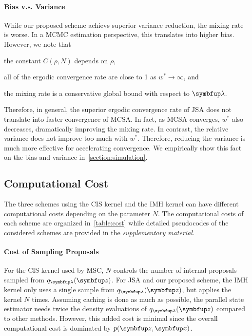 

\paragraph{Bias v.s. Variance}
While our proposed scheme achievs superior variance reduction, the mixing rate is worse.
In a MCMC estimation perspective, this translates into higher bias.
However, we note that
\begin{enumerate*}[label=\textbf{(\roman*)}]
  \item the constant \(C\left(\rho, N\right)\) depends on \(\rho\), 
  \item all of the ergodic convergence rate are close to 1 as \(w^* \rightarrow \infty\), and
  \item the mixing rate is a conservative global bound with respect to \(\vlambda\).
\end{enumerate*}
Therefore, in general, the superior ergodic convergence rate of JSA does not translate into faster convergence of MCSA.
In fact, as MCSA converges, \(w^*\) also decreases, dramatically improving the mixing rate.
In contrast, the relative variance does not improve too much with \(w^*\).
Therefore, reducing the variance is much more effective for accelerating convergence.
We empirically show this fact on the bias and variance in~\cref{section:simulation}.

\begin{wraptable}{r}{0.6\textwidth}
  \vspace{-0.5in}
  
  \vspace{-0.2in}
\end{wraptable}
%
\subsection{Computational Cost}
The three schemes using the CIS kernel and the IMH kernel can have different computational costs depending on the parameter \(N\).
The computational costs of each scheme are organized in~\cref{table:cost} while detailed pseudocodes of the considered schemes are provided in the \textit{supplementary material}.

\vspace{-0.05in}
\paragraph{Cost of Sampling Proposals}
For the CIS kernel used by MSC, \(N\) controls the number of internal proposals sampled from \(q_{\vlambda}(\vz)\).
For JSA and our proposed scheme, the IMH kernel only uses a single sample from \(q_{\vlambda}(\vz)\), but applies the kernel \(N\) times.
Assuming caching is done as much as possible, the parallel state estimator needs twice the density evaluations of \(q_{\vlambda}(\vz)\) compared to other methods.
However, this added cost is minimal since the overall computational cost is dominated by  \(p(\vz,\vx)\).


